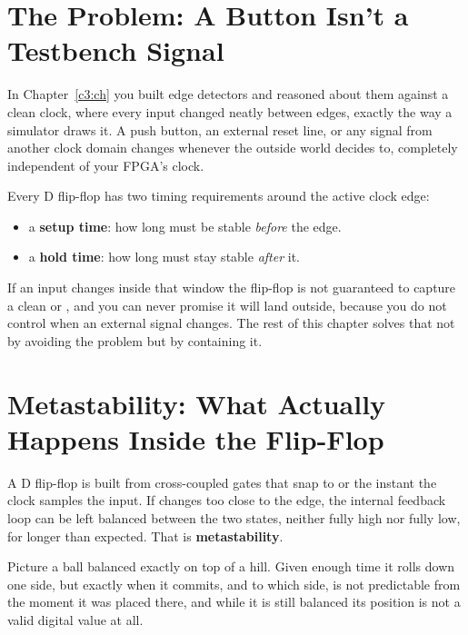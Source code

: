 
\section{The Problem: A Button Isn't a Testbench Signal}
\label{c4:a1}
In Chapter~\ref{c3:ch} you built edge detectors and reasoned about them against a clean clock, where
every input changed neatly between edges, exactly the way a simulator draws it. A push button, an
external reset line, or any signal from another clock domain changes whenever the outside world
decides to, completely independent of your FPGA's clock.

Every D flip-flop has two timing requirements around the active clock edge:
\begin{itemize}
  \item a \textbf{setup time}: how long  must be stable \emph{before} the edge.
  \item a \textbf{hold time}: how long  must stay stable \emph{after} it.
\end{itemize}
If an input changes inside that window the flip-flop is not guaranteed to capture a clean 
or , and you can never promise it will land outside, because you do not control when an
external signal changes. The rest of this chapter solves that not by avoiding the problem but by
containing it.

\section{Metastability: What Actually Happens Inside the Flip-Flop}
\label{c4:a2}
A D flip-flop is built from cross-coupled gates that snap to  or  the instant the
clock samples the input. If  changes too close to the edge, the internal feedback loop can
be left balanced between the two states, neither fully high nor fully low, for longer than
expected. That is \textbf{metastability}.

Picture a ball balanced exactly on top of a hill. Given enough time it rolls down one side, but
exactly when it commits, and to which side, is not predictable from the moment it was placed there,
and while it is still balanced its position is not a valid digital value at all.

